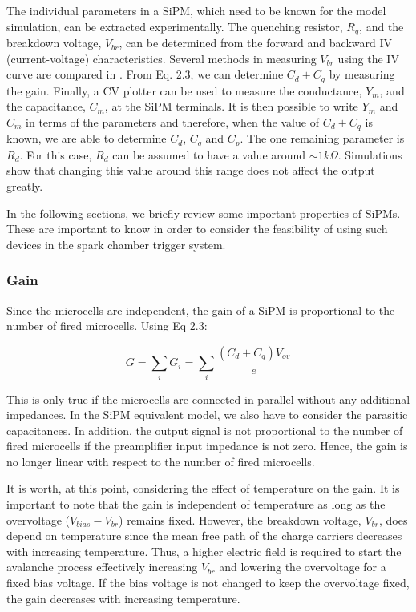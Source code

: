 \noindent The individual parameters in a SiPM, which need to be known for the model simulation, can be extracted experimentally. The quenching resistor, $R_q$, and the breakdown voltage, $V_{br}$, can be determined from the forward and backward IV (current-voltage) characteristics. Several methods in measuring \(V_{br}\) using the IV curve are compared in \cite{nagai2019}. From Eq. 2.3, we can determine $C_d+C_q$ by measuring the gain. Finally, a CV plotter can be used to measure the conductance, $Y_m$, and the capacitance, $C_m$, at the SiPM terminals. It is then possible to write $Y_m$ and $C_m$ in terms of the parameters and therefore, when the value of $C_d+C_q$ is known, we are able to determine $C_d$, $C_q$ and $C_p$. \cite{corsi2006} The one remaining parameter is $R_d$. For this case, $R_d$ can be assumed to have a value around $\sim 1k\Omega$. Simulations show that changing this value around this range does not affect the output greatly. \cite{acerbi2019}

In the following sections, we briefly review some important properties of SiPMs. These are important to know in order to consider the feasibility of using such devices in the spark chamber trigger system.

\subsubsection{Gain}

Since the microcells are independent, the gain of a SiPM is proportional to the number of fired microcells. Using Eq 2.3:

\[
   G =\sum_i G_i= \sum_i \frac{(C_d+C_q)V_{ov}}{e} \tag{2.4}
\]

\noindent This is only true if the microcells are connected in parallel without any additional impedances. In the SiPM equivalent model, we also have to consider the parasitic capacitances. In addition, the output signal is not proportional to the number of fired microcells if the preamplifier input impedance is not zero. \cite{seifert2010} Hence, the gain is no longer linear with respect to the number of fired microcells.

It is worth, at this point, considering the effect of temperature on the gain. It is important to note that the gain is independent of temperature as long as the overvoltage ($V_{bias}-V_{br}$) remains fixed. However, the breakdown voltage, $V_{br}$, does depend on temperature since the mean free path of the charge carriers decreases with increasing temperature. Thus, a higher electric field is required to start the avalanche process effectively increasing $V_{br}$ and lowering the overvoltage for a fixed bias voltage. \cite{gundacker2020} If the bias voltage is not changed to keep the overvoltage fixed, the gain decreases with increasing temperature.

